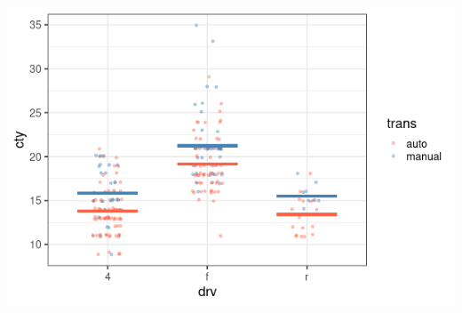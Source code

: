 \documentclass{beamer}
\begin{document}
\begin{frame}
\begin{center}
\includegraphics[scale=0.5]{double_cat_pred.png}
\end{center}
\end{frame}


%
%
%
%
%
%


%
%
\end{document}
